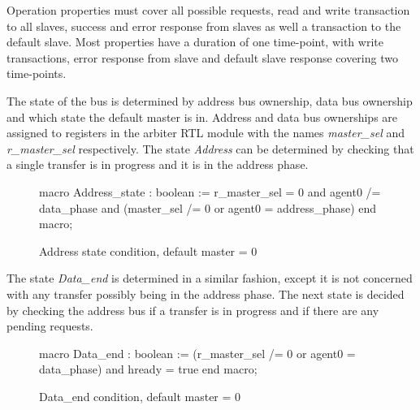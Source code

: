 Operation properties must cover all possible requests, read and write transaction to all slaves, success and error response from slaves as well a transaction to the default slave. Most properties have a duration of one time-point, with write transactions, error response from slave and default slave response covering two time-points. \par
The state of the bus is determined by address bus ownership, data bus ownership and which state the default master is in. Address and data bus ownerships are assigned to registers in the arbiter RTL module with the names \textit{master\_sel} and \textit{r\_master\_sel} respectively. The state \textit{Address} can be determined by checking that a single transfer is in progress and it is in the address phase.  
\begin{figure}[h!]
\begin{VHI}
macro Address_state : boolean :=
r_master_sel = 0 and agent0 /= data_phase and
(master_sel /= 0 or agent0 = address_phase)
end macro;
\end{VHI}
\caption{Address state condition, default master = 0}
\end{figure}

The state \textit{Data\_end} is determined in a similar fashion, except it is not concerned with any transfer possibly being in the address phase. The next state is decided by checking the address bus if a transfer is in progress and if there are any pending requests.
\begin{figure}[h!]
\begin{VHI}
macro Data_end : boolean :=
(r_master_sel /= 0 or agent0 = data_phase) and hready = true
end macro;
\end{VHI} 
\caption{Data\_end condition, default master = 0}
\end{figure}

